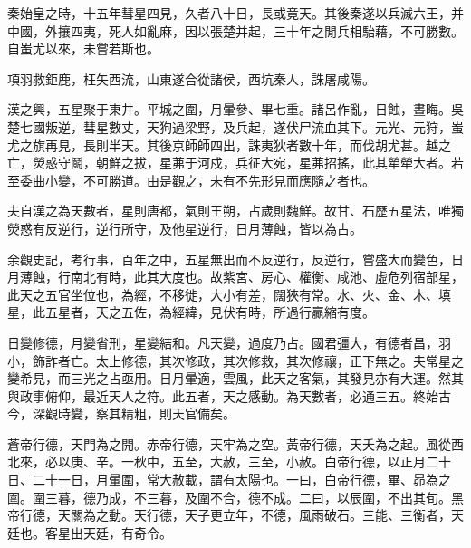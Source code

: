 秦始皇之時，十五年彗星四見，久者八十日，長或竟天。其後秦遂以兵滅六王，并中國，外攘四夷，死人如亂麻，因以張楚并起，三十年之閒兵相駘藉，不可勝數。自蚩尤以來，未嘗若斯也。

項羽救鉅鹿，枉矢西流，山東遂合從諸侯，西坑秦人，誅屠咸陽。

漢之興，五星聚于東井。平城之圍，月暈參、畢七重。諸呂作亂，日蝕，晝晦。吳楚七國叛逆，彗星數丈，天狗過梁野，及兵起，遂伏尸流血其下。元光、元狩，蚩尤之旗再見，長則半天。其後京師師四出，誅夷狄者數十年，而伐胡尤甚。越之亡，熒惑守鬬，朝鮮之拔，星茀于河戍，兵征大宛，星茀招搖，此其犖犖大者。若至委曲小變，不可勝道。由是觀之，未有不先形見而應隨之者也。

夫自漢之為天數者，星則唐都，氣則王朔，占歲則魏鮮。故甘、石歷五星法，唯獨熒惑有反逆行，逆行所守，及他星逆行，日月薄蝕，皆以為占。

余觀史記，考行事，百年之中，五星無出而不反逆行，反逆行，嘗盛大而變色，日月薄蝕，行南北有時，此其大度也。故紫宮、房心、權衡、咸池、虛危列宿部星，此天之五官坐位也，為經，不移徙，大小有差，闊狹有常。水、火、金、木、填星，此五星者，天之五佐，為經緯，見伏有時，所過行贏縮有度。

日變修德，月變省刑，星變結和。凡天變，過度乃占。國君彊大，有德者昌，羽小，飾詐者亡。太上修德，其次修政，其次修救，其次修禳，正下無之。夫常星之變希見，而三光之占亟用。日月暈適，雲風，此天之客氣，其發見亦有大運。然其與政事俯仰，最近天人之符。此五者，天之感動。為天數者，必通三五。終始古今，深觀時變，察其精粗，則天官備矣。

蒼帝行德，天門為之開。赤帝行德，天牢為之空。黃帝行德，天夭為之起。風從西北來，必以庚、辛。一秋中，五至，大赦，三至，小赦。白帝行德，以正月二十日、二十一日，月暈圍，常大赦載，謂有太陽也。一曰，白帝行德，畢、昴為之圍。圍三暮，德乃成，不三暮，及圍不合，德不成。二曰，以辰圍，不出其旬。黑帝行德，天關為之動。天行德，天子更立年，不德，風雨破石。三能、三衡者，天廷也。客星出天廷，有奇令。